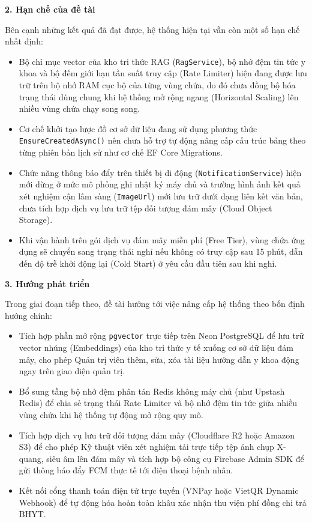 \textbf{2. Hạn chế của đề tài}

Bên cạnh những kết quả đã đạt được, hệ thống hiện tại vẫn còn một số hạn chế nhất định:
\begin{itemize}
    \item Bộ chỉ mục vector của kho tri thức RAG (\texttt{RagService}), bộ nhớ đệm tin tức y khoa và bộ đếm giới hạn tần suất truy cập (Rate Limiter) hiện đang được lưu trữ trên bộ nhớ RAM cục bộ của từng vùng chứa, do đó chưa đồng bộ hóa trạng thái dùng chung khi hệ thống mở rộng ngang (Horizontal Scaling) lên nhiều vùng chứa chạy song song.
    \item Cơ chế khởi tạo lược đồ cơ sở dữ liệu đang sử dụng phương thức \texttt{EnsureCreatedAsync()} nên chưa hỗ trợ tự động nâng cấp cấu trúc bảng theo từng phiên bản lịch sử như cơ chế EF Core Migrations.
    \item Chức năng thông báo đẩy trên thiết bị di động (\texttt{NotificationService}) hiện mới dừng ở mức mô phỏng ghi nhật ký máy chủ và trường hình ảnh kết quả xét nghiệm cận lâm sàng (\texttt{ImageUrl}) mới lưu trữ dưới dạng liên kết văn bản, chưa tích hợp dịch vụ lưu trữ tệp đối tượng đám mây (Cloud Object Storage).
    \item Khi vận hành trên gói dịch vụ đám mây miễn phí (Free Tier), vùng chứa ứng dụng sẽ chuyển sang trạng thái nghỉ nếu không có truy cập sau 15 phút, dẫn đến độ trễ khởi động lại (Cold Start) ở yêu cầu đầu tiên sau khi nghỉ.
\end{itemize}

\textbf{3. Hướng phát triển}

Trong giai đoạn tiếp theo, đề tài hướng tới việc nâng cấp hệ thống theo bốn định hướng chính:
\begin{itemize}
    \item Tích hợp phần mở rộng \texttt{pgvector} trực tiếp trên Neon PostgreSQL để lưu trữ vector nhúng (Embeddings) của kho tri thức y tế xuống cơ sở dữ liệu đám mây, cho phép Quản trị viên thêm, sửa, xóa tài liệu hướng dẫn y khoa động ngay trên giao diện quản trị.
    \item Bổ sung tầng bộ nhớ đệm phân tán Redis không máy chủ (như Upstash Redis) để chia sẻ trạng thái Rate Limiter và bộ nhớ đệm tin tức giữa nhiều vùng chứa khi hệ thống tự động mở rộng quy mô.
    \item Tích hợp dịch vụ lưu trữ đối tượng đám mây (Cloudflare R2 hoặc Amazon S3) để cho phép Kỹ thuật viên xét nghiệm tải trực tiếp tệp ảnh chụp X-quang, siêu âm lên đám mây và tích hợp bộ công cụ Firebase Admin SDK để gửi thông báo đẩy FCM thực tế tới điện thoại bệnh nhân.
    \item Kết nối cổng thanh toán điện tử trực tuyến (VNPay hoặc VietQR Dynamic Webhook) để tự động hóa hoàn toàn khâu xác nhận thu viện phí đồng chi trả BHYT.
\end{itemize}
